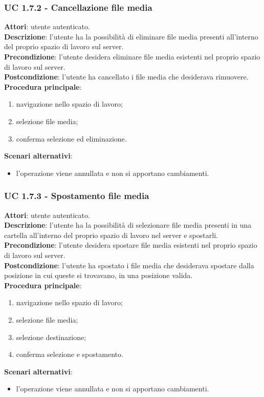 	\subsubsection{UC 1.7.2 - Cancellazione file media}{
		\label{uc1.7.2}
		\textbf{Attori}: utente autenticato.	\\
		\textbf{Descrizione}: l'utente ha la possibilità di eliminare file media presenti all'interno del proprio spazio di lavoro sul server. \\
		\textbf{Precondizione}: l'utente desidera eliminare file media esistenti nel proprio spazio di lavoro sul server.	\\
		\textbf{Postcondizione}: l'utente ha cancellato i file media che desiderava rimuovere.	\\
		\textbf{Procedura principale}:
		\begin{enumerate}
			\item navigazione nello spazio di lavoro;
			\item selezione file media;
			\item conferma selezione ed eliminazione.
		\end{enumerate}
		\textbf{Scenari alternativi}: 
		\begin{itemize}
			\item l'operazione viene annullata e non si apportano cambiamenti.
		\end{itemize}
		}
	\subsubsection{UC 1.7.3 - Spostamento file media}{
		\label{uc1.7.3}
		\textbf{Attori}: utente autenticato.	\\
		\textbf{Descrizione}: l'utente ha la possibilità di selezionare file media presenti in una cartella all'interno del proprio spazio di lavoro nel server e spostarli. \\
		\textbf{Precondizione}: l'utente desidera spostare file media esistenti nel proprio spazio di lavoro sul server.	\\
		\textbf{Postcondizione}: l'utente ha spostato i file media che desiderava spostare dalla posizione in cui queste si trovavano, in una posizione valida.	\\
		\textbf{Procedura principale}:
		\begin{enumerate}
			\item navigazione nello spazio di lavoro;
			\item selezione file media;
			\item selezione destinazione;
			\item conferma selezione e spostamento.
		\end{enumerate}
		\textbf{Scenari alternativi}: 
		\begin{itemize}
			\item l'operazione viene annullata e non si apportano cambiamenti.
		\end{itemize}
		}

